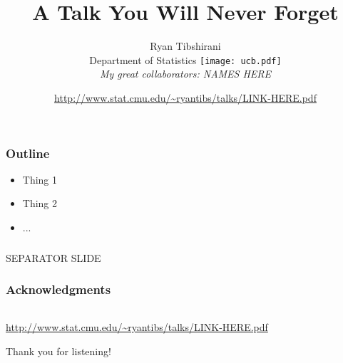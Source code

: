 \documentclass[mathserif]{beamer} %
\title{A Talk You Will Never Forget}
\author{\large Ryan Tibshirani \\
Department of Statistics 
\smallskip
\texttt{[image: ucb.pdf]} \\
\bigskip
\normalsize
{\it My great collaborators: NAMES HERE}}
\date{\footnotesize
\url{http://www.stat.cmu.edu/~ryantibs/talks/LINK-HERE.pdf}}
\begin{document}
\begin{frame}
\maketitle
\thispagestyle{empty}
\end{frame} 
\addtocounter{framenumber}{-1}

\begin{frame}
\frametitle{}
\end{frame}

\begin{frame}
\frametitle{Outline}
\begin{itemize}
\item Thing 1
\item Thing 2
\item ...
\end{itemize}
\end{frame}

\begin{frame}
\frametitle{}
\centering\Large\blue 
\bigskip
SEPARATOR SLIDE
\end{frame}

\begin{frame}
\frametitle{Acknowledgments}
\begin{center}
\begin{tabular}{ccc}
\end{tabular}

\bigskip
{\small
\url{http://www.stat.cmu.edu/~ryantibs/talks/LINK-HERE.pdf}}

\bigskip
Thank you for listening!
\end{center}
\end{frame}
\end{document}
